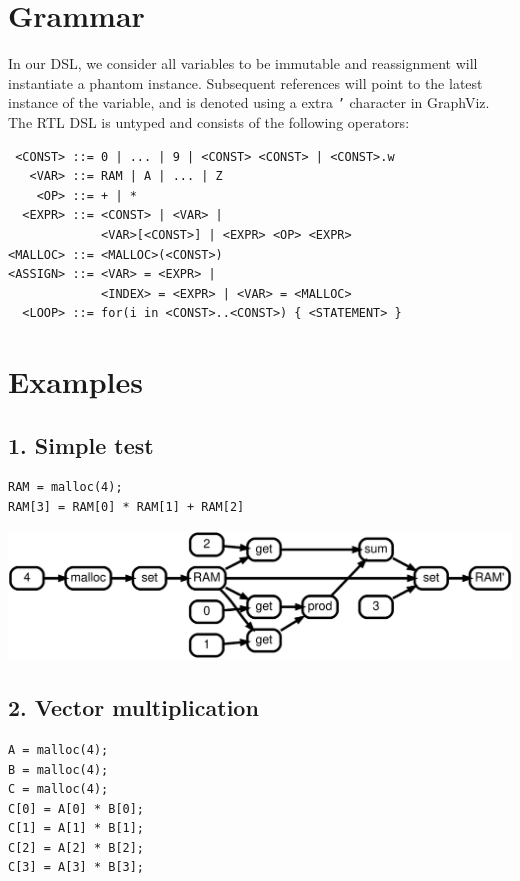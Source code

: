 \documentclass[sigplan,10pt,review,anonymous]{acmart}
\begin{document}

\pagebreak\appendix

\section{Grammar}
In our DSL, we consider all variables to be immutable and reassignment will instantiate a phantom instance. Subsequent references will point to the latest instance of the variable, and is denoted using a extra \texttt{'} character in GraphViz. The RTL DSL is untyped and consists of the following operators:

\begin{lstlisting}
 <CONST> ::= 0 | ... | 9 | <CONST> <CONST> | <CONST>.w
   <VAR> ::= RAM | A | ... | Z
    <OP> ::= + | *
  <EXPR> ::= <CONST> | <VAR> |
             <VAR>[<CONST>] | <EXPR> <OP> <EXPR>
<MALLOC> ::= <MALLOC>(<CONST>)
<ASSIGN> ::= <VAR> = <EXPR> |
             <INDEX> = <EXPR> | <VAR> = <MALLOC>
  <LOOP> ::= for(i in <CONST>..<CONST>) { <STATEMENT> }
\end{lstlisting}
\normalsize

\section{Examples}
\subsection*{1. Simple test}

\begin{lstlisting}
RAM = malloc(4);
RAM[3] = RAM[0] * RAM[1] + RAM[2]
\end{lstlisting}

\includegraphics[scale=0.1]{rtd31}

\subsection*{2. Vector multiplication}

\begin{lstlisting}
A = malloc(4);
B = malloc(4);
C = malloc(4);
C[0] = A[0] * B[0];
C[1] = A[1] * B[1];
C[2] = A[2] * B[2];
C[3] = A[3] * B[3];
\end{lstlisting}
\end{document}
